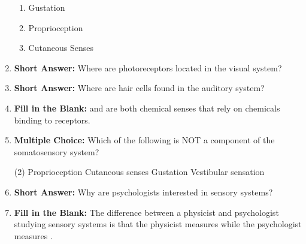 \begin{enumerate}[label=\textbf{Q2.7.\arabic*}]
\begin{enumerate}[label=(\arabic*)]
                  \item Gustation \quad \dotfill \quad \underline{\hspace{1cm}} \\
                  \item Proprioception \quad \dotfill \quad \underline{\hspace{1cm}} \\
                  \item Cutaneous Senses \quad \dotfill \quad \underline{\hspace{1cm}} 
            \end{enumerate}
            
      \item \textbf{Short Answer:} Where are photoreceptors located in the visual system? \\
            
      \item \textbf{Short Answer:} Where are hair cells found in the auditory system? \\
            
      \item \textbf{Fill in the Blank:} \underline{\hspace{3cm}} and \underline{\hspace{3cm}} are both chemical senses that rely on chemicals binding to receptors. \\
            
      \item \textbf{Multiple Choice:} Which of the following is NOT a component of the somatosensory system?
            \begin{tasks}[label=(\Alph*), label-width=1.5em, item-indent=1.7em](2)
                  \task Proprioception
                  \task Cutaneous senses
                  \task Gustation
                  \task Vestibular sensation
            \end{tasks}
            
      \item \textbf{Short Answer:} Why are psychologists interested in sensory systems? \\
            
      \item \textbf{Fill in the Blank:} The difference between a physicist and psychologist studying sensory systems is that the physicist measures \underline{\hspace{3cm}} while the psychologist measures \underline{\hspace{3cm}}. \\
            

\end{enumerate}

